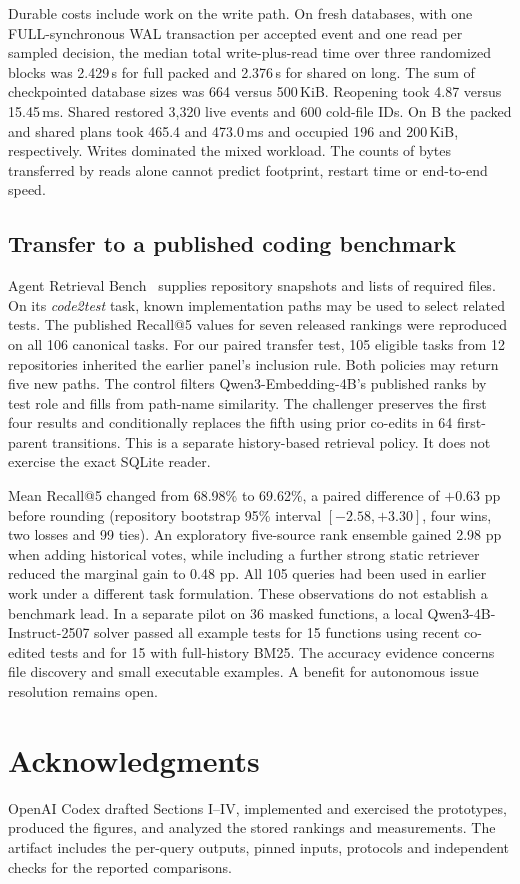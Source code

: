 \documentclass[conference]{IEEEtran}
\begin{document}
Durable costs include work on the write path. On fresh databases, with one FULL-synchronous WAL transaction per accepted event and one read per sampled decision, the median total write-plus-read time over three randomized blocks was 2.429\,s for full packed and 2.376\,s for shared on long. The sum of checkpointed database sizes was 664 versus 500\,KiB. Reopening took 4.87 versus 15.45\,ms. Shared restored 3,320 live events and 600 cold-file IDs. On B the packed and shared plans took 465.4 and 473.0\,ms and occupied 196 and 200\,KiB, respectively. Writes dominated the mixed workload. The counts of bytes transferred by reads alone cannot predict footprint, restart time or end-to-end speed.

\subsection{Transfer to a published coding benchmark}
Agent Retrieval Bench~\cite{arb} supplies repository snapshots and lists of required files. On its \emph{code2test} task, known implementation paths may be used to select related tests. The published Recall@5 values for seven released rankings were reproduced on all 106 canonical tasks. For our paired transfer test, 105 eligible tasks from 12 repositories inherited the earlier panel's inclusion rule. Both policies may return five new paths. The control filters Qwen3-Embedding-4B's published ranks by test role and fills from path-name similarity. The challenger preserves the first four results and conditionally replaces the fifth using prior co-edits in 64 first-parent transitions. This is a separate history-based retrieval policy. It does not exercise the exact SQLite reader.

Mean Recall@5 changed from 68.98\% to 69.62\%, a paired difference of $+0.63$ pp before rounding (repository bootstrap 95\% interval $[-2.58,+3.30]$, four wins, two losses and 99 ties). An exploratory five-source rank ensemble gained 2.98 pp when adding historical votes, while including a further strong static retriever reduced the marginal gain to 0.48 pp. All 105 queries had been used in earlier work under a different task formulation. These observations do not establish a benchmark lead. In a separate pilot on 36 masked functions, a local Qwen3-4B-Instruct-2507 solver passed all example tests for 15 functions using recent co-edited tests and for 15 with full-history BM25. The accuracy evidence concerns file discovery and small executable examples. A benefit for autonomous issue resolution remains open.

\section*{Acknowledgments}
OpenAI Codex drafted Sections I--IV, implemented and exercised the prototypes, produced the figures, and analyzed the stored rankings and measurements. The artifact includes the per-query outputs, pinned inputs, protocols and independent checks for the reported comparisons.

\balance


\end{document}
